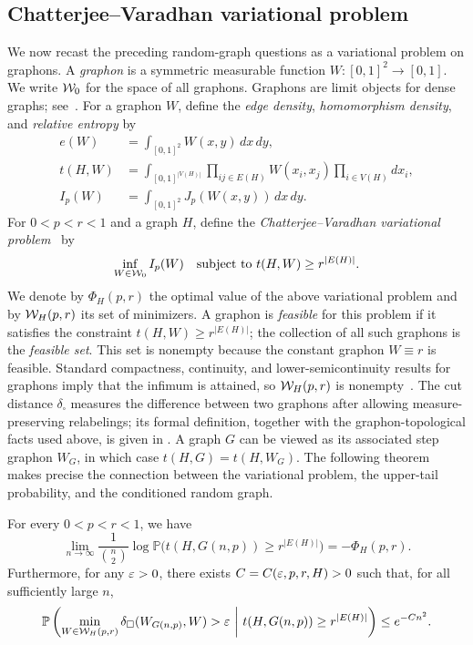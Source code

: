 \subsection{Chatterjee--Varadhan variational problem}
We now recast the preceding random-graph questions as a variational problem on
graphons.
A \emph{graphon} is a symmetric measurable function $W:[0,1]^2\to[0,1]$.
We write $\mathcal W_0$ for the space of all graphons.
Graphons are limit objects for dense graphs; see~\cite{LovaszGraphLimits}.
For a graphon $W$, define the \emph{edge density}, \emph{homomorphism density}, and \emph{relative entropy} by 
\begin{equation}\label{eq:graphon-quantities}
  \begin{aligned}
  e(W) & =\int_{[0,1]^2}W(x,y)\,dx\,dy,
  \\
  t(H,W) & =\int_{[0,1]^{|V(H)|}}\prod_{ij\in E(H)}W(x_i,x_j)\prod_{i\in V(H)}dx_i,
  \\
  I_p(W) & =\int_{[0,1]^2}J_p(W(x,y))\,dx\,dy.
  \end{aligned}
\end{equation}
For $0<p<r<1$ and a graph $H$, define the \emph{Chatterjee--Varadhan variational problem}~\cite{ChatterjeeVaradhanLDP} by
\begin{equation}\label{eq:graphon-variational-problem}
    \inf_{W\in\mathcal W_0} I_p(W)\quad \text{subject to } t(H,W)\ge r^{|E(H)|}.
\end{equation}
We denote by $\Phi_H(p,r)$ the optimal value of the above variational problem
and by $\mathcal W_H(p,r)$ its set of minimizers.  A graphon is \emph{feasible} for
this problem if it satisfies the constraint
$t(H,W)\ge r^{|E(H)|}$; the collection of all such graphons is the \emph{feasible
set}.  This set is nonempty because the constant graphon $W\equiv r$ is
feasible.  Standard compactness, continuity, and lower-semicontinuity results
for graphons imply that the infimum is attained, so $\mathcal W_H(p,r)$ is nonempty~\cite[Theorem~2.7]{lubetzky2015large}.
The cut distance $\delta_\square$ measures the difference between two graphons
after allowing measure-preserving relabelings; its formal definition, together
with the graphon-topological facts used above, is given in
.  A graph $G$ can be viewed as its associated step graphon
$W_G$, in which case $t(H,G)=t(H,W_G)$.
The following theorem makes precise the connection between the variational
problem, the upper-tail probability, and the conditioned random graph.
\begin{theorem}
\label{thm:graphon-large-deviations}
  For every $0<p<r<1$, we have 
  \[
    \lim_{n \to \infty}\frac{1}{\binom{n}{2}}
    \log \mathbb{P}\bigl(t(H,G(n,p))\ge r^{|E(H)|}\bigr)
    =-\Phi_H(p,r).
  \]
  Furthermore, for any $\varepsilon>0$, there exists $C=C(\varepsilon, p, r, H)>0$ such that, for all sufficiently large $n$,
  \[
    \mathbb{P}\left(
      \min_{W \in \mathcal W_H(p,r)}\delta_\square(W_{G(n,p)},W)>\varepsilon
      \ \middle|\ t(H,G(n,p))\ge r^{|E(H)|}
    \right)
    \le e^{-Cn^2}.
  \]
\end{theorem}
